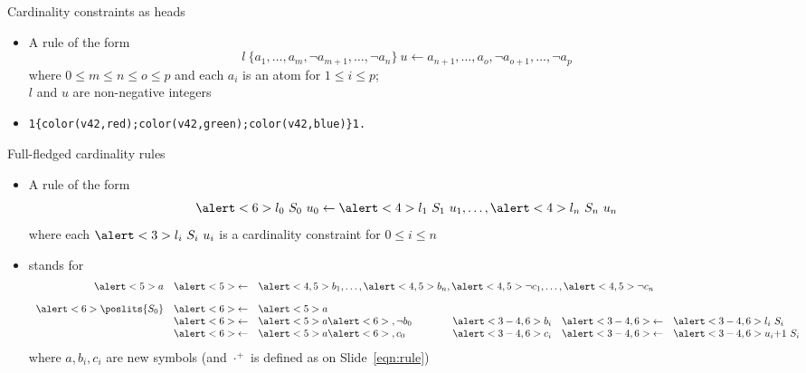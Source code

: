 \begin{frame}[fragile]{Cardinality constraints as heads}
  \begin{itemize}
  \item A rule of the form
    \[
    l~\{a_1,\dots,a_m,\neg a_{m+1},\dots,\neg a_n\}~u\leftarrow a_{n+1},\dots,a_o,\neg a_{o+1},\dots,\neg a_p
    \]
    where $0\leq m\leq n\leq o\leq p$ and each $a_i$ is an atom for $1\leq i\leq p$;\\
    $l$ and $u$ are non-negative integers
    \smallskip
  \item<3-> 
\begin{lstlisting}[basicstyle=\ttfamily\small]
1{color(v42,red);color(v42,green);color(v42,blue)}1.
\end{lstlisting}
  \end{itemize}
\end{frame}
\begin{frame}{Full-fledged cardinality rules}
  \begin{itemize}
  \item A rule of the form
    \[
    \alert<6>{l_0~S_0~u_0}\leftarrow\alert<4>{l_1~S_1~u_1},\dots,\alert<4>{l_n~S_n~u_n}
    \]
    where each $\alert<3>{l_i~S_i~u_i}$ is a cardinality constraint for $0\leq i\leq n$
  \item<2-> [] stands for %
    \[
    \begin{array}{rclp{20pt}rcl}
            \alert<5>{a}&\alert<5>{\leftarrow}&\multicolumn{5}{l}{\alert<4,5>{b_1},\dots,\alert<4,5>{b_n},\alert<4,5>{\neg
                                                c_1},\dots,\alert<4,5>{\neg c_n}}\\[10pt]
\alert<6>{\poslits{S_0}}&\alert<6>{\leftarrow}&\alert<5>{a}\\
                        &\alert<6>{\leftarrow}&\alert<5>{a}\alert<6>{,\neg b_0}&&\alert<3-4,6>{b_i}&\alert<3-4,6>{\leftarrow}&\alert<3-4,6>{l_i~S_i}\\
                        &\alert<6>{\leftarrow}&\alert<5>{a}\alert<6>{,     c_0 }&&\alert<3-4,6>{c_i}&\alert<3-4,6>{\leftarrow}&\alert<3-4,6>{u_i{+}1~S_i}
    \end{array}
    \]
    where $a,b_i,c_i$ are new symbols (and $\cdot^+$ is defined as on Slide~\ref{eqn:rule})
  \end{itemize}
\end{frame}
